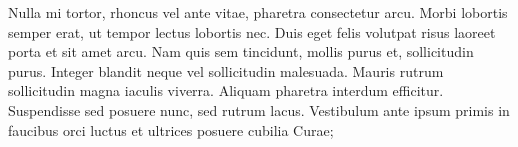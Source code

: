 Nulla mi tortor, rhoncus vel ante vitae, pharetra consectetur arcu. Morbi lobortis semper erat, ut tempor lectus lobortis nec. Duis eget felis volutpat risus laoreet porta et sit amet arcu. Nam quis sem tincidunt, mollis purus et, sollicitudin purus. Integer blandit neque vel sollicitudin malesuada. Mauris rutrum sollicitudin magna iaculis viverra. Aliquam pharetra interdum efficitur. Suspendisse sed posuere nunc, sed rutrum lacus. Vestibulum ante ipsum primis in faucibus orci luctus et ultrices posuere cubilia Curae;
